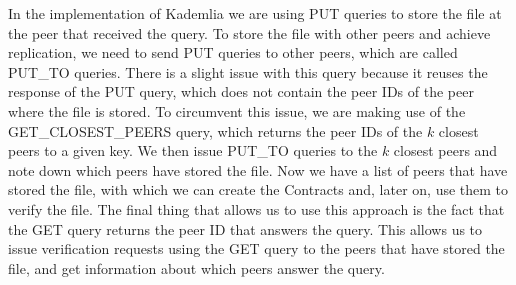 In the implementation of Kademlia we are using PUT queries to store the file at the peer that received the query.
To store the file with other peers and achieve replication, we need to send PUT queries to other peers, which are called PUT\_TO queries.
There is a slight issue with this query because it reuses the response of the PUT query, which does not contain the peer IDs of the peer where the file is stored.
To circumvent this issue, we are making use of the GET\_CLOSEST\_PEERS query, which returns the peer IDs of the $k$ closest peers to a given key.
We then issue PUT\_TO queries to the $k$ closest peers and note down which peers have stored the file.
Now we have a list of peers that have stored the file, with which we can create the Contracts and, later on, use them to verify the file.
The final thing that allows us to use this approach is the fact that the GET query returns the peer ID that answers the query.
This allows us to issue verification requests using the GET query to the peers that have stored the file, and get information about which peers answer the query.

